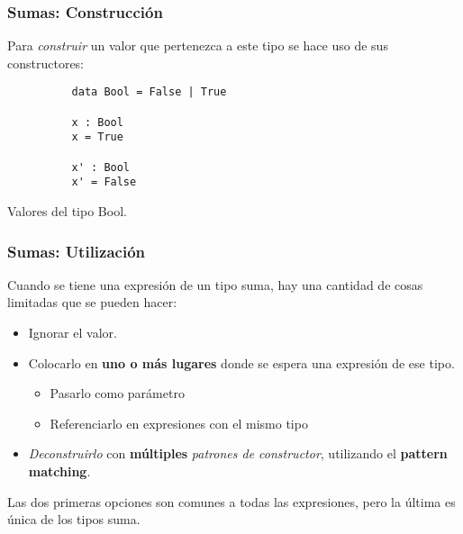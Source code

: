 \documentclass{beamer}
\begin{document}
\begin{frame}[fragile]
  \frametitle{Sumas: Construcción}

  Para \emph{construir} un valor que pertenezca a este tipo se hace uso de sus
  constructores:

  \begin{listing}[H]
    \begin{center}
      \begin{minipage}{0.5\textwidth}
        \begin{verbatim}
          data Bool = False | True

          x : Bool
          x = True

          x' : Bool
          x' = False
        \end{verbatim}
      \end{minipage}
    \end{center}
    \caption{Valores del tipo Bool.}
    \label{lst:boolvalues}
  \end{listing}

\end{frame}

\begin{frame}[fragile]
  \frametitle{Sumas: Utilización}

  Cuando se tiene una expresión de un tipo suma, hay una cantidad de cosas limitadas
  que se pueden hacer:

  \begin{itemize}
    \item Ignorar el valor.
    \item Colocarlo en \textbf{uno o más lugares} donde se espera una
      expresión de ese tipo.
      \begin{itemize}
        \item Pasarlo como parámetro
        \item Referenciarlo en expresiones con el mismo tipo
      \end{itemize}
    \item \emph{Deconstruirlo} con \textbf{múltiples} \emph{patrones de constructor},
      utilizando el \textbf{pattern matching}.
  \end{itemize}

  Las dos primeras opciones son comunes a todas las expresiones, pero la
  última es única de los tipos suma.
\end{frame}
\end{document}
